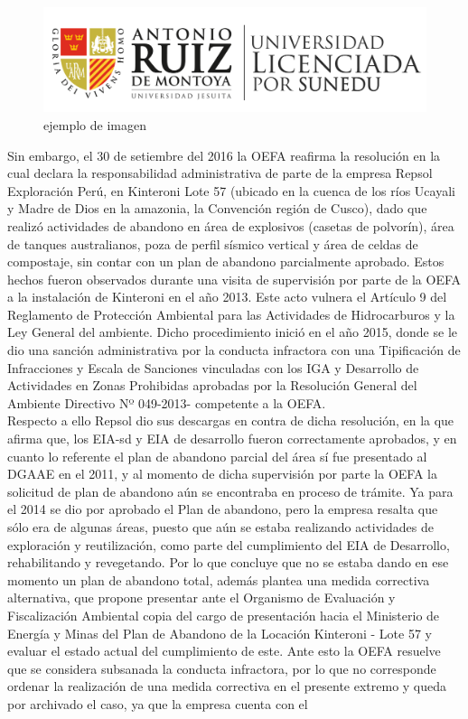 \documentclass[12pt, a4paper]{article} %
\begin{document}
            \begin{figure}[H]
                \centering
                \includegraphics[scale=0.3]{logo_ruiz.png}
                \caption{ejemplo de imagen}
                \label{fig:figura1}
            \end{figure}
            
            \begin{multicols}{2}
            Sin embargo, el 30 de setiembre del 2016 la OEFA reafirma la resolución en la cual declara la responsabilidad administrativa de parte de la empresa Repsol Exploración Perú, en Kinteroni Lote 57 (ubicado en la cuenca de los ríos Ucayali y Madre de Dios en la amazonia, la Convención región de Cusco), dado que realizó actividades de abandono en área de explosivos (casetas de polvorín), área de tanques australianos, poza de perfil sísmico vertical y área de celdas de compostaje, sin contar con un plan de abandono parcialmente aprobado. Estos hechos fueron observados durante una visita de supervisión por parte de la OEFA a la instalación de Kinteroni en el año 2013. Este acto vulnera el Artículo 9 del Reglamento de Protección Ambiental para las Actividades de Hidrocarburos y la Ley General del ambiente. Dicho procedimiento inició en el año 2015, donde se le dio una sanción administrativa por la conducta infractora con una Tipificación de Infracciones y Escala de Sanciones vinculadas con los IGA y Desarrollo de Actividades en Zonas Prohibidas aprobadas por la Resolución General del Ambiente Directivo Nº 049-2013- competente a la OEFA.\\Respecto a ello Repsol dio sus descargas en contra de dicha resolución, en la que afirma que, los EIA-sd y EIA de desarrollo fueron correctamente aprobados, y en cuanto lo referente el plan de abandono parcial del área sí fue presentado al DGAAE en el 2011, y al momento de dicha supervisión por parte la OEFA la solicitud de plan de abandono aún se encontraba en proceso de trámite. Ya para el 2014 se dio por aprobado el Plan de abandono, pero la empresa resalta que sólo era de algunas áreas, puesto que aún se estaba realizando actividades de exploración y reutilización, como parte del cumplimiento del EIA de Desarrollo, rehabilitando y revegetando. Por lo que concluye que no se estaba dando en ese momento un plan de abandono total, además plantea una medida correctiva alternativa, que propone presentar ante el Organismo de Evaluación y Fiscalización Ambiental copia del cargo de presentación hacia el Ministerio de Energía y Minas del Plan de Abandono de la Locación Kinteroni - Lote 57 y evaluar el estado actual del cumplimiento de este. Ante esto la OEFA resuelve que se considera subsanada la conducta infractora, por lo que no corresponde ordenar la realización de una medida correctiva en el presente extremo y queda por archivado el caso, ya que la empresa cuenta con el 
\end{multicols}
\end{document}

